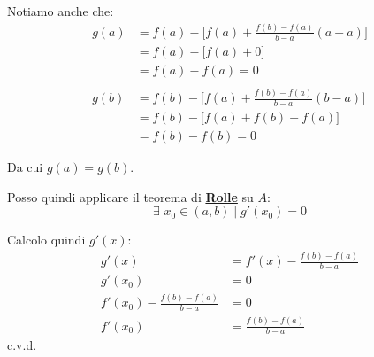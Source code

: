 \documentclass[../dimostrazioni]{subfiles}
\begin{document}
            Notiamo anche che:
            \begin{align*}
                g(a) &= f(a) - \bigg[f(a) + \frac{f(b) - f(a)}{b - a}(a - a) \bigg]\\
                     &= f(a) - \bigg[f(a) + 0 \bigg]\\
                     &= f(a) - f(a) = 0\\
                     \\
                g(b) &= f(b) - \bigg[f(a) + \frac{f(b) - f(a)}{b - a}(b - a) \bigg]\\
                     &= f(b) - \bigg[f(a) + f(b) - f(a) \bigg]\\
                     &= f(b) - f(b) = 0
            \end{align*}
            
            Da cui \( g(a) = g(b) \).

            Posso quindi applicare il teorema di \textbf{\hyperref[teoRolle]{Rolle}} su \( A \):
            \[
                \exists \, \, x_0 \in (a,b) \; | \; g'(x_0) = 0
            \]
            
            Calcolo quindi \( g'(x) \):
            \begin{align*}
                g'(x) &= f'(x) - \frac{f(b) - f(a)}{b-a}\\
                g'(x_0) &= 0\\
                f'(x_0) - \frac{f(b) - f(a)}{b-a} &= 0\\
                f'(x_0) &= \frac{f(b) - f(a)}{b-a}
            \end{align*} c.v.d.
    
\end{document}
